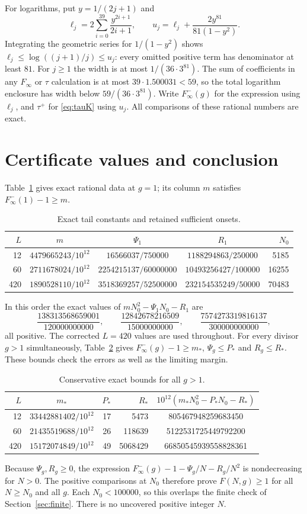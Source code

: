 \documentclass[10pt]{article}
\theoremstyle{remark}
\begin{document}
For logarithms, put $y=1/(2j+1)$ and
\[
 \ell_j=2\sum_{i=0}^{39}\frac{y^{2i+1}}{2i+1},\qquad
 u_j=\ell_j+\frac{2y^{81}}{81(1-y^2)}.
\]
Integrating the geometric series for $1/(1-y^2)$ shows
$\ell_j\le\log((j+1)/j)\le u_j$: every omitted positive term has
denominator at least $81$. For $j\ge1$ the width is at most
$1/(36\cdot3^{81})$. The sum of coefficients in any $F_\infty$ or
$\tau$ calculation is at most $39\cdot1.500031<59$, so the total
logarithm enclosure has width below $59/(36\cdot3^{81})$.
Write $F^-_\infty(g)$ for the expression using $\ell_j$, and $\tau^+$
for \eqref{eq:tauK} using $u_j$. All comparisons of these rational
numbers are exact.

\section{Certificate values and conclusion}\label{sec:values}
Table~\ref{tab:tail1} gives exact rational data at $g=1$; its column
$m$ satisfies $F^-_\infty(1)-1\ge m$.
\begin{table}[ht]
\centering\small
\begin{tabular}{r|c|c|c|r}
$L$ & $m$ & $\Psi_1$ & $R_1$ & $N_0$\\\hline
12 & $4479665243/10^{12}$ & $16566037/750000$ & $1188294863/250000$ & 5185\\
60 & $2711678024/10^{12}$ & $2254215137/60000000$ & $10493256427/100000$ & 16255\\
420 & $1890528110/10^{12}$ & $3518369257/52500000$ & $232154535249/50000$ & 70483
\end{tabular}
\caption{Exact tail constants and retained sufficient onsets.}\label{tab:tail1}
\end{table}
In this order the exact values of $mN_0^2-\Psi_1N_0-R_1$ are
\[
 \frac{138313568659001}{120000000000},\qquad
 \frac{12842678216509}{15000000000},\qquad
 \frac{7574273319816137}{300000000000},
\]
all positive. The corrected $L=420$ values are used throughout.
For every divisor $g>1$ simultaneously, Table~\ref{tab:tailg} gives
$F^-_\infty(g)-1\ge m_*$, $\Psi_g\le P_*$ and $R_g\le R_*$.
These bounds check the errors as well as the limiting margin.
\begin{table}[ht]
\centering\small
\begin{tabular}{r|c|r|r|c}
$L$ & $m_*$ & $P_*$ & $R_*$ & $10^{12}(m_*N_0^2-P_*N_0-R_*)$\\\hline
12 & $33442881402/10^{12}$ & 17 & 5473 & 805467948259683450\\
60 & $21435519688/10^{12}$ & 26 & 118639 & 5122531725449792200\\
420 & $15172074849/10^{12}$ & 49 & 5068429 & 66850545939558828361
\end{tabular}
\caption{Conservative exact bounds for all $g>1$.}\label{tab:tailg}
\end{table}
Because $\Psi_g,R_g\ge0$, the expression
$F^-_\infty(g)-1-\Psi_g/N-R_g/N^2$ is nondecreasing for $N>0$.
The positive comparisons at $N_0$ therefore prove $F(N,g)\ge1$ for
all $N\ge N_0$ and all $g$. Each $N_0<100000$, so this overlaps the
finite check of Section~\ref{sec:finite}. There is no uncovered positive
integer $N$.
\end{document}
